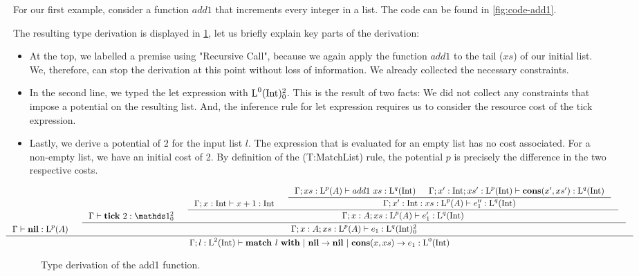 \begin{example}
   For our first example, consider a function \(add1\) that increments every integer in a list. The code can be found in \cref{fig:code-add1}.

The resulting type derivation is displayed in \cref{fig:type-derivation-add1}, let us briefly explain key parts of the derivation:

\begin{itemize}
   \item At the top, we labelled a premise using "Recursive Call", because we again apply the function \(add1\) to the tail (\(xs\)) of our initial list. We, therefore, can stop the derivation at this point without loss of information. We already collected the necessary constraints.

   \item In the second line, we typed the let expression with \(\text{L}^{0}(\text{Int}) ^{2}_{0}\). This is the result of two facts: We did not collect any constraints that impose a potential on the resulting list. And, the inference rule for let expression requires us to consider the resource cost of the tick expression. 

   \item Lastly, we derive a potential of \(2\) for the input list \(l\). The expression that is evaluated for an empty list has no cost associated. For a non-empty list, we have an initial cost of 2. By definition of the (T:MatchList) rule, the potential \(p\) is precisely the difference in the two respective costs.
\end{itemize}

\begin{sidewaysfigure}
\begin{figure}[H]
   \[
      \hspace*{-1.5cm}
      \inference
      {
         \typing{\Gamma}{\listnil}{\ralist{p}{A}} 
         &
         \inference
         {
            \typing{\Gamma}{\tick{2}}{\ratype{\unit}{2}{0}}
            &
            \inference
            {
               \typing{\Gamma;x:\typeint}{x + 1}{\typeint}
               &
               \inference
               {
                  \typing{\Gamma;xs:\ralist{p}{A}}{add1~xs}{\ralist{q}{\typeint}}
                  &
                  \typing{\Gamma;x':\typeint;xs':\ralist{p}{\typeint}}{\cons{x'}{xs'}}{\ralist{q}{\typeint}}  
               }
               {
                  \typing{\Gamma;x':\typeint:xs:\ralist{p}{A}}{e_1''}{\ralist{q}{\typeint}}
               }
            }
            {
               \typing{\Gamma;x:A;xs:\ralist{p}{A}}{e_1'}{\ralist{q}{\typeint}}
            }
         }
         {
            \typing{\Gamma;x:A;xs:\ralist{p}{A}}{e_1}{\ratype{\ralist{q}{\typeint}}{2}{0}}
         }
      }
      {
         \typing{\Gamma;l : \ralist{2}{\typeint}}{\listmatch{l}{\listnil}{e_1}}{\ralist{0}{\typeint}}
      }
   \]
   \caption{Type derivation of the add1 function.}
   \label{fig:type-derivation-add1}
\end{figure}
\end{sidewaysfigure}


\end{example}
